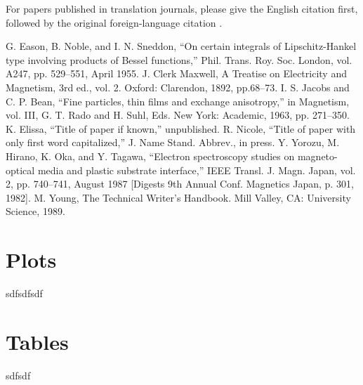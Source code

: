 \documentclass[conference]{IEEEtran}
\begin{document}
For papers published in translation journals, please give the English 
citation first, followed by the original foreign-language citation \cite{b6}.

\begin{thebibliography}{00}
 G. Eason, B. Noble, and I. N. Sneddon, ``On certain integrals of Lipschitz-Hankel type involving products of Bessel functions,'' Phil. Trans. Roy. Soc. London, vol. A247, pp. 529--551, April 1955.
 J. Clerk Maxwell, A Treatise on Electricity and Magnetism, 3rd ed., vol. 2. Oxford: Clarendon, 1892, pp.68--73.
 I. S. Jacobs and C. P. Bean, ``Fine particles, thin films and exchange anisotropy,'' in Magnetism, vol. III, G. T. Rado and H. Suhl, Eds. New York: Academic, 1963, pp. 271--350.
 K. Elissa, ``Title of paper if known,'' unpublished.
 R. Nicole, ``Title of paper with only first word capitalized,'' J. Name Stand. Abbrev., in press.
 Y. Yorozu, M. Hirano, K. Oka, and Y. Tagawa, ``Electron spectroscopy studies on magneto-optical media and plastic substrate interface,'' IEEE Transl. J. Magn. Japan, vol. 2, pp. 740--741, August 1987 [Digests 9th Annual Conf. Magnetics Japan, p. 301, 1982].
 M. Young, The Technical Writer's Handbook. Mill Valley, CA: University Science, 1989.
\end{thebibliography}
\vspace{12pt}



\appendix

\section*{Plots}


sdfsdfsdf

\section*{Tables}


sdfsdf
\end{document}
